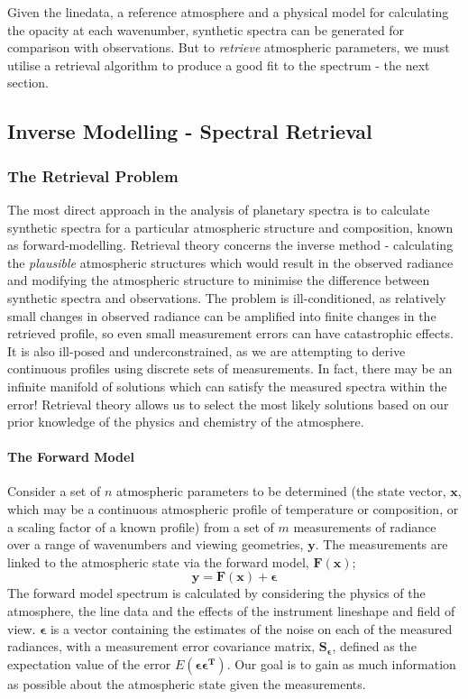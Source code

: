 \documentclass[final,5p,times,twocolumn,authoryear]{elsarticle}
\begin{document}
Given the linedata, a reference atmosphere and a physical model for calculating the opacity at each wavenumber, synthetic spectra can be generated for comparison with observations.  But to \textit{retrieve} atmospheric parameters, we must utilise a retrieval algorithm to produce a good fit to the spectrum - the next section.

\subsection{Inverse Modelling - Spectral Retrieval}

\subsubsection{The Retrieval Problem}

The most direct approach in the analysis of planetary spectra is to calculate synthetic spectra for a particular atmospheric structure and composition, known as forward-modelling. Retrieval theory concerns the inverse method - calculating the \textit{plausible} atmospheric structures which would result in the observed radiance and modifying the atmospheric structure to minimise the difference between synthetic spectra and observations.  The problem is ill-conditioned, as relatively small changes in observed radiance can be amplified into finite changes in the retrieved profile, so even small measurement errors can have catastrophic effects.  It is also ill-posed and underconstrained, as we are attempting to derive continuous profiles using discrete sets of measurements.  In fact, there may be an infinite manifold of solutions which can satisfy the measured spectra within the error!  Retrieval theory allows us to select the most likely solutions based on our prior knowledge of the physics and chemistry of the atmosphere.

\paragraph{The Forward Model}

Consider a set of $n$ atmospheric parameters to be determined (the state vector, $\mathbf{x}$, which may be a continuous atmospheric profile of temperature or composition, or a scaling factor of a known profile) from a set of $m$ measurements of radiance over a range of wavenumbers and viewing geometries, $\mathbf{y}$.  The measurements are linked to the atmospheric state via the forward model, $\mathbf{F(x)}$;
\begin{equation}
\mathbf{y}= \mathbf{F(x)}+\mathbf{\epsilon}
\end{equation}
The forward model spectrum is calculated by considering the physics of the atmosphere, the line data and the effects of the instrument lineshape and field of view.  $\mathbf{\epsilon}$ is a vector containing the estimates of the noise on each of the measured radiances, with a measurement error covariance matrix, $\mathbf{S_{\epsilon}}$, defined as the expectation value of the error $E(\mathbf{\epsilon \epsilon^T})$.  Our goal is to gain as much information as possible about the atmospheric state given the measurements.
\end{document}
